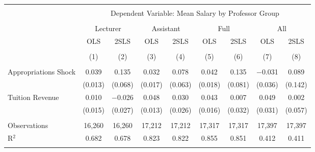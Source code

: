 
\begin{tabular}{@{\extracolsep{5pt}}lcccccccc} 
\\[-1.8ex]\hline 
\hline \\[-1.8ex] 
 & \multicolumn{8}{c}{Dependent Variable: Mean Salary by Professor Group} \\ 
\cline{2-9} 
\\[-1.8ex] & \multicolumn{2}{c}{Lecturer} & \multicolumn{2}{c}{Assistant} & \multicolumn{2}{c}{Full} & \multicolumn{2}{c}{All} \\ 
 & OLS & 2SLS & OLS & 2SLS & OLS & 2SLS & OLS & 2SLS \\ 
\\[-1.8ex] & (1) & (2) & (3) & (4) & (5) & (6) & (7) & (8)\\ 
\hline \\[-1.8ex] 
 Appropriations Shock & 0.039 & 0.135 & 0.032 & 0.078 & 0.042 & 0.135 & $-$0.031 & 0.089 \\ 
  & (0.013) & (0.068) & (0.017) & (0.063) & (0.018) & (0.081) & (0.036) & (0.142) \\ 
  Tuition Revenue & 0.010 & $-$0.026 & 0.048 & 0.030 & 0.043 & 0.007 & 0.049 & 0.002 \\ 
  & (0.015) & (0.027) & (0.013) & (0.026) & (0.016) & (0.032) & (0.031) & (0.057) \\ 
 \hline \\[-1.8ex] 
Observations & 16,260 & 16,260 & 17,212 & 17,212 & 17,317 & 17,317 & 17,397 & 17,397 \\ 
R$^{2}$ & 0.682 & 0.678 & 0.823 & 0.822 & 0.855 & 0.851 & 0.412 & 0.411 \\ 
\hline 
\hline \\[-1.8ex] 
\end{tabular} 
